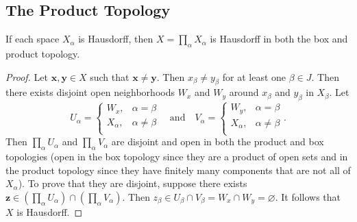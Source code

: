 \subsection{The Product Topology}
\begin{ex}{19.3}
    If each space $X_\alpha$ is Hausdorff, then $X =\prod_\alpha X_\alpha$ is Hausdorff in both the box and product topology.
\end{ex}
\begin{proof}
    Let $\mathbf{x}, \mathbf{y}\in X$ such that $\mathbf{x}\neq\mathbf{y}$. Then $x_\beta\neq y_\beta$ for at least one $\beta\in J$.
    Then there exists disjoint open neighborhoods $W_x$ and $W_y$ around $x_\beta$ and $y_\beta$ in  $X_\beta$. Let
    $$
    U_\alpha=
    \begin{cases}
        W_x,&\alpha=\beta\\
        X_\alpha,&\alpha\neq\beta\\
    \end{cases}
    \quad\text{and}\quad 
    V_\alpha= 
    \begin{cases}
        W_y,&\alpha=\beta\\
        X_\alpha,&\alpha\neq\beta\\
    \end{cases}.
    $$
    Then $\prod_\alpha U_\alpha$ and $\prod_\alpha V_\alpha$ are disjoint and open in both the product and box topologies
    (open in the box topology since they are a product of open sets and in the product topology since they have finitely many components that are not all of $X_\alpha$).
    To prove that they are disjoint, suppose there exists $\mathbf{z}\in\left(\prod_\alpha U_\alpha\right)\cap\left(\prod_\alpha V_\alpha\right)$.
    Then $z_\beta\in U_\beta\cap V_\beta=W_x\cap W_y=\varnothing$.
    It follows that $X$ is Hausdorff.
\end{proof}

